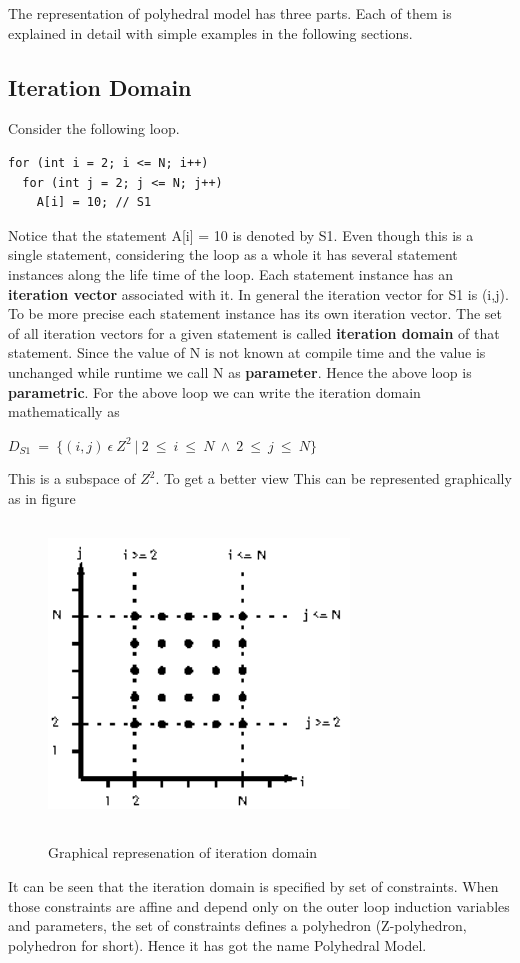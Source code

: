 The representation of polyhedral model has three parts. Each of them is explained in detail with simple
examples in the following sections.

\subsection{Iteration Domain}
Consider the following loop.
{\footnotesize
\begin{lstlisting}
for (int i = 2; i <= N; i++)
  for (int j = 2; j <= N; j++)
    A[i] = 10; // S1
\end{lstlisting}
}
Notice that the statement A[i] = 10 is denoted by S1. Even though this is a single statement, considering
the loop as a whole it has several statement instances along the life time of the loop. Each statement
instance has an \textbf{iteration vector} associated with it. In general the iteration vector for S1 is (i,j).
To be more precise each statement instance has its own iteration vector. The set of all iteration vectors
for a given statement is called \textbf{iteration domain} of that statement. Since the value of N
is not known at compile time and the value is unchanged while runtime we call N as \textbf{parameter}.
Hence the above loop is \textbf{parametric}. For the above loop we can write the iteration domain mathematically as
\begin{center}
$D_{S1}\ =\ \{(i,j)\ \epsilon\ Z^2\ |\ 2\ \leq\ i\ \leq\ N\ \wedge\ 2\ \leq\ j\ \leq\ N\}$
\end{center}
This is a subspace of $Z^2$. To get a better view This can be represented graphically as in figure 
\begin{figure}
\begin{center}
  \label{fig:iter}
  \includegraphics[height=8cm,width=8cm]{images/iter.eps}
  \caption{Graphical represenation of iteration domain}
\end{center}  
\end{figure}
It can be seen that the iteration domain is specified by set of constraints. When those constraints are
affine and depend only on the outer loop induction variables and parameters, the set of constraints
defines a polyhedron (Z-polyhedron, polyhedron for short). Hence it has got the name Polyhedral Model.

